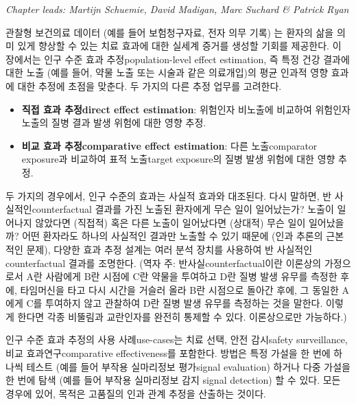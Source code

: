 \documentclass[10.5pt]{book}
\providecommand{\tightlist}{%
  \setlength{\itemsep}{0pt}\setlength{\parskip}{0pt}}
\theoremstyle{definition}
\theoremstyle{definition}
\theoremstyle{definition}
\theoremstyle{remark}
\begin{document}
\emph{Chapter leads: Martijn Schuemie, David Madigan, Marc Suchard \&
Patrick Ryan}


관찰형 보건의료 데이터 (예를 들어 보험청구자료, 전자 의무 기록) 는
환자의 삶을 의미 있게 향상할 수 있는 치료 효과에 대한 실세계 증거를
생성할 기회를 제공한다. 이 장에서는 인구 수준 효과 추정population-level
effect estimation, 즉 특정 건강 결과에 대한 노출 (예를 들어, 약물 노출
또는 시술과 같은 의료개입)의 평균 인과적 영향 효과에 대한 추정에 초점을
맞춘다. 두 가지의 다른 추정 업무를 고려한다.

\begin{itemize}
\tightlist
\item
  \textbf{직접 효과 추정direct effect estimation}: 위험인자 비노출에
  비교하여 위험인자 노출의 질병 결과 발생 위험에 대한 영향 추정.
\item
  \textbf{비교 효과 추정comparative effect estimation}: 다른
  노출comparator exposure과 비교하여 표적 노출target exposure의 질병
  발생 위험에 대한 영향 추정. 
\end{itemize}

두 가지의 경우에서, 인구 수준의 효과는 사실적 효과와 대조된다. 다시
말하면, 반 사실적인counterfactual 결과를 가진 노출된 환자에게 무슨 일이
일어났는가? 노출이 일어나지 않았다면 (직접적) 혹은 다른 노출이
일어났다면 (상대적) 무슨 일이 일어났을까? 어떤 환자라도 하나의 사실적인
결과만 노출할 수 있기 때문에 (인과 추론의 근본적인 문제), 다양한 효과
추정 설계는 여러 분석 장치를 사용하여 반 사실적인counterfactual 결과를
조명한다. (역자 주: 반사실counterfactual이란 이론상의 가정으로서 A란
사람에게 B란 시점에 C란 약물을 투여하고 D란 질병 발생 유무를 측정한
후에, 타임머신을 타고 다시 시간을 거슬러 올라 B란 시점으로 돌아간 후에,
그 동일한 A에게 C를 투여하지 않고 관찰하여 D란 질병 발생 유무를 측정하는
것을 말한다. 이렇게 한다면 각종 비뚤림과 교란인자를 완전히 통제할 수
있다. 이론상으로만 가능하다.) 

인구 수준 효과 추정의 사용 사례use-cases는 치료 선택, 안전 감시safety
surveillance, 비교 효과연구comparative effectiveness를 포함한다. 방법은
특정 가설을 한 번에 하나씩 테스트 (예를 들어 부작용 실마리정보
평가signal evaluation) 하거나 다중 가설을 한 번에 탐색 (예를 들어 부작용
실마리정보 감지 signal detection) 할 수 있다. 모든 경우에 있어, 목적은
고품질의 인과 관계 추정을 산출하는 것이다. 
\end{document}
